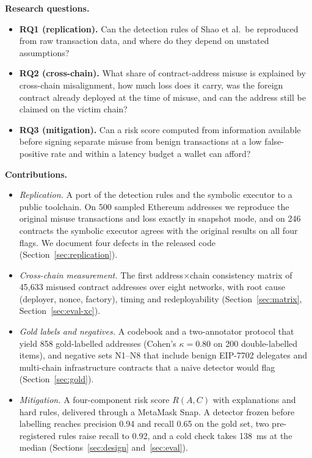 \documentclass[runningheads]{llncs}
\begin{document}
\medskip\noindent\textbf{Research questions.}
\begin{itemize}
\item \textbf{RQ1 (replication).} Can the detection rules of Shao et al.\ be
reproduced from raw transaction data, and where do they depend on unstated
assumptions?
\item \textbf{RQ2 (cross-chain).} What share of contract-address misuse is
explained by cross-chain misalignment, how much loss does it carry, was the
foreign contract already deployed at the time of misuse, and can the address
still be claimed on the victim chain?
\item \textbf{RQ3 (mitigation).} Can a risk score computed from information
available before signing separate misuse from benign transactions at a low
false-positive rate and within a latency budget a wallet can afford?
\end{itemize}

\medskip\noindent\textbf{Contributions.}
\begin{itemize}
\item \emph{Replication.} A port of the detection rules and the symbolic
executor to a public toolchain. On 500 sampled Ethereum addresses we reproduce
the original misuse transactions and loss exactly in snapshot mode, and on 246
contracts the symbolic executor agrees with the original results on all four
flags. We document four defects in the released code
(Section~\ref{sec:replication}).
\item \emph{Cross-chain measurement.} The first address$\times$chain consistency
matrix of 45{,}633 misused contract addresses over eight networks, with root
cause (deployer, nonce, factory), timing and redeployability
(Section~\ref{sec:matrix}, Section~\ref{sec:eval-xc}).
\item \emph{Gold labels and negatives.} A codebook and a two-annotator protocol
that yield 858 gold-labelled addresses (Cohen's $\kappa=0.80$ on 200
double-labelled items), and negative sets N1--N8 that include benign
EIP-7702 delegates and multi-chain infrastructure contracts that a naive
detector would flag (Section~\ref{sec:gold}).
\item \emph{Mitigation.} A four-component risk score $R(A,C)$ with
explanations and hard rules, delivered through a MetaMask Snap. A detector
frozen before labelling reaches precision 0.94 and recall 0.65 on the gold set,
two pre-registered rules raise recall to 0.92, and a cold check takes 138~ms at
the median (Sections~\ref{sec:design} and~\ref{sec:eval}).
\end{itemize}
\end{document}

